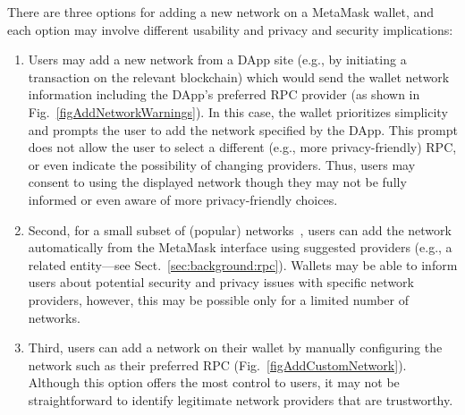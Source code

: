 \documentclass[conference]{IEEEtran}
\begin{document}
There are three options for adding a new network on a MetaMask wallet, and each option may involve different usability and privacy and security implications:
\begin{enumerate}
    \item Users may add a new network from a DApp site (e.g., by initiating a transaction on the relevant blockchain) which would send the wallet network information including the DApp's preferred \ac*{RPC} provider (as shown in Fig.~\ref{figAddNetworkWarnings}). In this case, the wallet prioritizes simplicity and prompts the user to add the network specified by the DApp. This prompt does not allow the user to select a different (e.g., more privacy-friendly) \ac*{RPC}, or even indicate the possibility of changing providers. Thus, users may consent to using the displayed network though they may not be fully informed or even aware of more privacy-friendly choices. %

    \item Second, for a small subset of (popular) networks~\cite{metamaskAddCustomNetwork}, users can add the network automatically from the MetaMask interface using suggested providers (e.g., a related entity---see Sect.~\ref{sec:background:rpc}). %
    Wallets may be able to inform users about potential security and privacy issues with specific network providers, however, this may be possible only for a limited number of networks. %

    \item Third, users can add a network on their wallet by manually configuring the network such as their preferred \ac*{RPC} (Fig.~\ref{figAddCustomNetwork}). Although this option offers the most control to users, it may not be straightforward to identify legitimate network providers that are trustworthy. %
\end{enumerate}
\end{document}

